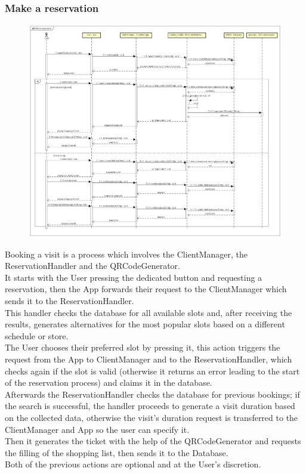 \documentclass[table, 12pt]{article}
\begin{document}
\subsubsection{Make a reservation}
\begin{figure}[H]
    \begin{center}
        \includegraphics[width=\textwidth]{assets/Sequence-Diagram/make-a-reservation.png}
    \end{center}
\end{figure}
Booking a visit is a process which involves the ClientManager, the ReservationHandler and the QRCodeGenerator.\\
It starts with the User pressing the dedicated button and requesting a reservation, then the App forwards their request to the ClientManager which sends it to the ReservationHandler.\\
This handler checks the database for all available slots and, after receiving the results, generates alternatives for the most popular slots based on a different schedule or store.\\
The User chooses their preferred slot by pressing it, this action triggers the request from the App to ClientManager and to the ReservationHandler, which checks again if the slot is valid (otherwise it returns an error leading to the start of the reservation process) and claims it in the database.\\
Afterwards the ReservationHandler checks the database for previous bookings; if the search is successful, the handler proceeds to generate a visit duration based on the collected data, otherwise the visit's duration request is transferred to the ClientManager and App so the user can specify it.\\
Then it generates the ticket with the help of the QRCodeGenerator and requests the filling of the shopping list, then sends it to the Database.\\
Both of the previous actions are optional and at the User's discretion.
\end{document}
